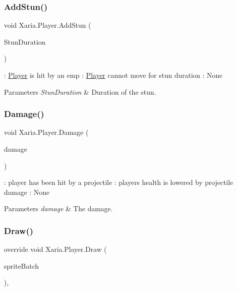 \subsubsection{\texorpdfstring{Add\+Stun()}{AddStun()}}
{\footnotesize\ttfamily void Xaria.\+Player.\+Add\+Stun (\begin{DoxyParamCaption}\item[{int}]{Stun\+Duration }\end{DoxyParamCaption})\hspace{0.3cm}{\ttfamily [inline]}}



\+: \hyperlink{classXaria_1_1Player}{Player} is hit by an emp \+: \hyperlink{classXaria_1_1Player}{Player} cannot move for stun duration \+: None 


\begin{DoxyParams}{Parameters}
{\em Stun\+Duration} & Duration of the stun.\\
\hline
\end{DoxyParams}
\mbox{\label{classXaria_1_1Player_aefc8537a0f978f3cc5f490d1fccefd56}} 
\subsubsection{\texorpdfstring{Damage()}{Damage()}}
{\footnotesize\ttfamily void Xaria.\+Player.\+Damage (\begin{DoxyParamCaption}\item[{int}]{damage }\end{DoxyParamCaption})\hspace{0.3cm}{\ttfamily [inline]}}



\+: player has been hit by a projectile \+: player\textquotesingle{}s health is lowered by projectile damage \+: None 


\begin{DoxyParams}{Parameters}
{\em damage} & The damage.\\
\hline
\end{DoxyParams}
\mbox{\label{classXaria_1_1Player_a25ddea2b9d8679ab6aa649fda6ce1f22}} 
\subsubsection{\texorpdfstring{Draw()}{Draw()}}
{\footnotesize\ttfamily override void Xaria.\+Player.\+Draw (\begin{DoxyParamCaption}\item[{ref Sprite\+Batch}]{sprite\+Batch }\end{DoxyParamCaption})\hspace{0.3cm}{\ttfamily [inline]}, {\ttfamily [virtual]}}




